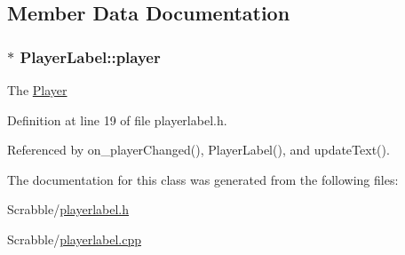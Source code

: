\subsection{Member Data Documentation}
\hypertarget{class_player_label_a3d7bf640f27b4539cb6886e53900b5b2}{
\subsubsection[{player}]{$\ast$ Player\-Label\-::player\hspace{0.3cm}{\ttfamily [private]}}}\label{class_player_label_a3d7bf640f27b4539cb6886e53900b5b2}
The \hyperlink{class_player}{Player} 

Definition at line 19 of file playerlabel.\-h.



Referenced by on\-\_\-player\-Changed(), Player\-Label(), and update\-Text().



The documentation for this class was generated from the following files\-:\begin{DoxyCompactItemize}
\item 
Scrabble/\hyperlink{playerlabel_8h}{playerlabel.\-h}\item 
Scrabble/\hyperlink{playerlabel_8cpp}{playerlabel.\-cpp}\end{DoxyCompactItemize}
